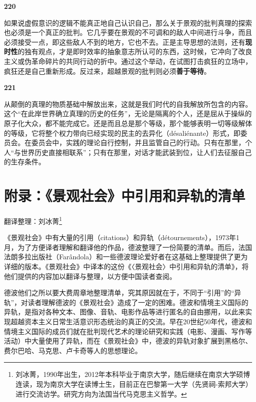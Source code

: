 \documentclass[fontset=fandol, a4paper, 12pt, openright]{ctexbook}
\makeatletter
\newcommand{\thesis}[1]{%
    \par\vspace{1.5em}%
    {\centering \textbf{\Large #1}\par}%
    \nobreak\vspace{0.5em}\nobreak
    \@afterindenttrue %
    \@afterheading    %
}
\makeatother
\begin{document}
\thesis{220}
如果说虚假意识的逻辑不能真正地自己认识自己，那么关于景观的批判真理的探索也必须是一个真正的批判。它几乎要在景观的不可调和的敌人中间进行斗争，而且必须接受一点，即这些敌人不到的地方，它也不去。正是主导思想的法则，还有\textbf{现时性}的独有观点，才是即时效率的抽象意志所认可的东西，这时候，它冲向了改良主义或伪革命碎片的共同行动的折中。通过这个举动，在试图打击疯狂的立场中，疯狂还是自己重新形成。反过来，超越景观的批判则必须\textbf{善于等待}。

\thesis{221}
从颠倒的真理的物质基础中解放出来，这就是我们时代的自我解放所包含的内容。这个“在此岸世界确立真理的历史的任务”，无论是隔离的个人，还是屈从于操纵的原子化大众，都不能完成它。还是而且总是那个等级，那个能够表明一切等级解体的等级，它将整个权力带向已经实现的民主的去异化（désaliénante）形式，即委员会。在委员会中，实践的理论自行控制，并且监管自己的行动。只有在那里，个人“与世界历史直接相联系”；只有在那里，对话才能武装到位，让人们去征服自己的生存条件。

\chapter*{附录：《景观社会》中引用和异轨的清单}

\setcounter{footnote}{0}

\begin{flushright}
{\kaishu 翻译整理：刘冰菁\footnote{刘冰菁，1990年出生，2012年本科毕业于南京大学，随后继续在南京大学硕博连读，现为南京大学在读博士生，目前正在巴黎第一大学（先贤祠-索邦大学）进行交流访学。研究方向为法国当代马克思主义哲学。}}
\end{flushright}

{\kaishu 《景观社会》中有大量的引用（citations）和异轨（détournements），1973年1月，为了方便译者理解和翻译他的作品，德波整理了一份简要的清单。而后，法国法朗多拉出版社（Farândola）和一些德波理论爱好者在这基础上整理提供了更为详细的版本。《景观社会》中译本的这份《〈景观社会〉中引用和异轨的清单》，将他们提供的内容加以翻译与整理，以方便中国读者查阅。}

{\kaishu 德波他们之所以要大费周章地整理清单，究其原因就在于，不同于“引用”的“异轨”，对读者理解德波的《景观社会》造成了一定的困难。德波和情境主义国际的异轨，是指对各种文本、图像、音轨、电影作品等进行匿名的自由挪用，以此来实现超越资本主义日常生活意识形态统治的真正的交流。早在20世纪50年代，德波和情境主义国际的成员们就在批判现代艺术的理论研究和实践（电影、漫画、写作等活动）中大量使用了异轨，而在《景观社会》中，德波的异轨对象扩展到黑格尔、费尔巴哈、马克思、卢卡奇等人的思想理论。}
\end{document}
